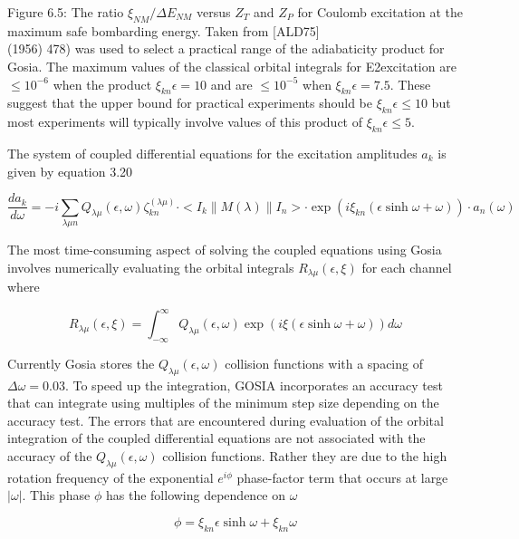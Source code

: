 \documentclass[10pt]{article}
\begin{document}
Figure 6.5: The ratio $\xi_{N M} / \Delta E_{N M}$ versus $Z_{T}$ and $Z_{P}$ for Coulomb excitation at the maximum safe bombarding energy. Taken from [ALD75]\\
(1956) 478) was used to select a practical range of the adiabaticity product for Gosia. The maximum values of the classical orbital integrals for E2excitation are $\leq 10^{-6}$ when the product $\xi_{k n} \epsilon=10$ and are $\leq 10^{-5}$ when $\xi_{k n} \epsilon=7.5$. These suggest that the upper bound for practical experiments should be $\xi_{k n} \epsilon \leq 10$ but most experiments will typically involve values of this product of $\xi_{k n} \epsilon \leq 5$.

The system of coupled differential equations for the excitation amplitudes $a_{k}$ is given by equation 3.20


\begin{equation*}
\frac{d a_{k}}{d \omega}=-i \sum_{\lambda \mu n} Q_{\lambda \mu}(\epsilon, \omega) \zeta_{k n}^{(\lambda \mu)} \cdot<I_{k}\|M(\lambda)\| I_{n}>\cdot \exp \left(i \xi_{k n}(\epsilon \sinh \omega+\omega)\right) \cdot a_{n}(\omega) \tag{3.20}
\end{equation*}


The most time-consuming aspect of solving the coupled equations using Gosia involves numerically evaluating the orbital integrals $R_{\lambda \mu}(\epsilon, \xi)$ for each channel where


\begin{equation*}
R_{\lambda \mu}(\epsilon, \xi)=\int_{-\infty}^{\infty} Q_{\lambda \mu}(\epsilon, \omega) \exp (i \xi(\epsilon \sinh \omega+\omega)) d \omega \tag{6.29}
\end{equation*}


Currently Gosia stores the $Q_{\lambda \mu}(\epsilon, \omega)$ collision functions with a spacing of $\Delta \omega=0.03$. To speed up the integration, GOSIA incorporates an accuracy test that can integrate using multiples of the minimum step size depending on the accuracy test. The errors that are encountered during evaluation of the orbital integration of the coupled differential equations are not associated with the accuracy of the $Q_{\lambda \mu}(\epsilon, \omega)$ collision functions. Rather they are due to the high rotation frequency of the exponential $e^{i \phi}$ phase-factor term that occurs at large $|\omega|$. This phase $\phi$ has the following dependence on $\omega$


\begin{equation*}
\phi=\xi_{k n} \epsilon \sinh \omega+\xi_{k n} \omega \tag{6.30}
\end{equation*}
\end{document}
